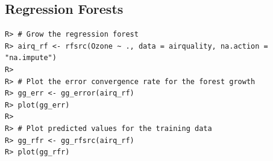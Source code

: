 \documentclass[nojss,letterpaper]{jss}\usepackage[]{graphicx}\usepackage[]{color}
\makeatletter
\newenvironment{kframe}{%
 \def\at@end@of@kframe{}%
 \ifinner\ifhmode%
  \def\at@end@of@kframe{\end{minipage}}%
  \begin{minipage}{\columnwidth}%
 \fi\fi%
 \def\FrameCommand##1{\hskip\@totalleftmargin \hskip-\fboxsep
 \colorbox{shadecolor}{##1}\hskip-\fboxsep
     \hskip-\linewidth \hskip-\@totalleftmargin \hskip\columnwidth}%
 \MakeFramed {\advance\hsize-\width
   \@totalleftmargin\z@ \linewidth\hsize
   \@setminipage}}%
 {\par\unskip\endMakeFramed%
 \at@end@of@kframe}
\newenvironment{knitrout}{}{} %
\makeatother
\begin{document}
\subsection{Regression Forests}

\begin{knitrout}\footnotesize
{}\color{fgcolor}\begin{kframe}
\begin{verbatim}
R> # Grow the regression forest
R> airq_rf <- rfsrc(Ozone ~ ., data = airquality, na.action = "na.impute")
R> 
R> # Plot the error convergence rate for the forest growth
R> gg_err <- gg_error(airq_rf)
R> plot(gg_err)
R> 
R> # Plot predicted values for the training data
R> gg_rfr <- gg_rfsrc(airq_rf)
R> plot(gg_rfr)
\end{verbatim}
\end{kframe}
\end{knitrout}

\end{document}
